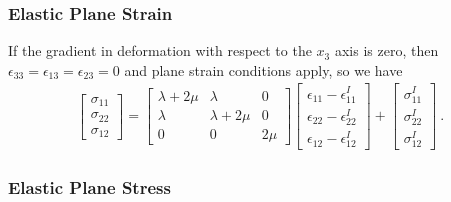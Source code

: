 \subsubsection{Elastic Plane Strain}

If the gradient in deformation with respect to the $x_{3}$ axis is
zero, then $\epsilon_{33}=\epsilon_{13}=\epsilon_{23}=0$ and plane
strain conditions apply, so we have 
\begin{gather}
\left[\begin{array}{c}
\sigma_{11}\\
\sigma_{22}\\
\sigma_{12}
\end{array}\right]=\left[\begin{array}{ccc}
\lambda+2\mu & \lambda & 0\\
\lambda & \lambda+2\mu & 0\\
0 & 0 & 2\mu
\end{array}\right]\left[\begin{array}{c}
\epsilon_{11}-\epsilon_{11}^{I}\\
\epsilon_{22}-\epsilon_{22}^{I}\\
\epsilon_{12}-\epsilon_{12}^{I}
\end{array}\right]+\left[\begin{array}{c}
\sigma_{11}^{I}\\
\sigma_{22}^{I}\\
\sigma_{12}^{I}
\end{array}\right]\:.\label{eq:10}
\end{gather}



\subsubsection{Elastic Plane Stress}

